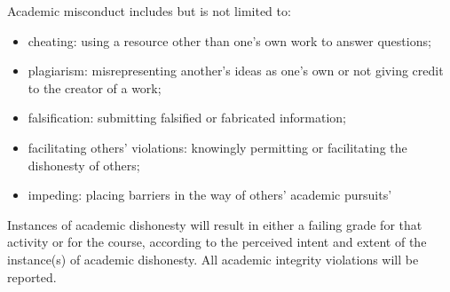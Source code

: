 \documentclass{tufte-handout}
\begin{document}
\begin{fullwidth}
Academic misconduct includes but is not limited to:

\begin{itemize}
	\item cheating: using a resource other than one's own work to answer questions;
	\item plagiarism: misrepresenting another's ideas as one's own or not giving credit to the creator of a work;
	\item falsification: submitting falsified or fabricated information;
	\item facilitating others' violations: knowingly permitting or facilitating the dishonesty of others;
	\item impeding: placing barriers in the way of others' academic pursuits'
\end{itemize}

Instances of academic dishonesty will result in either a failing grade for that activity or for the course, according to the perceived intent and extent of the instance(s) of academic dishonesty.
All academic integrity violations will be reported.

\end{fullwidth}
\end{document}
